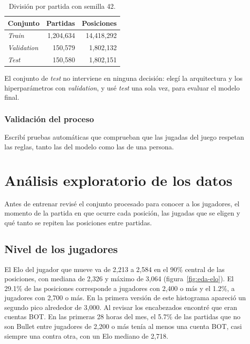 \documentclass[a4paper,12pt,twocolumn]{article}
\begin{document}
\begin{table}[H]
	\centering
	\footnotesize
	\begin{tabular}{lrr}
		\hline
		Conjunto & Partidas & Posiciones \\
		\hline
		\textit{Train} & 1,204,634 & 14,418,292 \\
		\textit{Validation} & 150,579 & 1,802,132 \\
		\textit{Test} & 150,580 & 1,802,151 \\
		\hline
	\end{tabular}
	\caption{División por partida con semilla 42.}
	\label{tab:split}
\end{table}

El conjunto de \textit{test} no interviene en ninguna decisión: elegí la arquitectura y los hiperparámetros con \textit{validation}, y usé \textit{test} una sola vez, para evaluar el modelo final.

\subsubsection{Validación del proceso}

Escribí pruebas automáticas que comprueban que las jugadas del juego respetan las reglas, tanto las del modelo como las de una persona.

\section{Análisis exploratorio de los datos}
\label{sec:eda}

Antes de entrenar revisé el conjunto procesado para conocer a los jugadores, el momento de la partida en que ocurre cada posición, las jugadas que se eligen y qué tanto se repiten las posiciones entre partidas.

\subsection{Nivel de los jugadores}

El Elo del jugador que mueve va de 2,213 a 2,584 en el 90\% central de las posiciones, con mediana de 2,326 y máximo de 3,064 (figura~\ref{fig:eda-elo}). El 29.1\% de las posiciones corresponde a jugadores con 2,400 o más y el 1.2\%, a jugadores con 2,700 o más.
\newline
En la primera versión de este histograma apareció un segundo pico alrededor de 3,000. Al revisar los encabezados encontré que eran cuentas BOT. En las primeras 28 horas del mes, el 5.7\% de las partidas que no son Bullet entre jugadores de 2,200 o más tenía al menos una cuenta BOT, casi siempre una contra otra, con un Elo mediano de 2,718.
\end{document}
